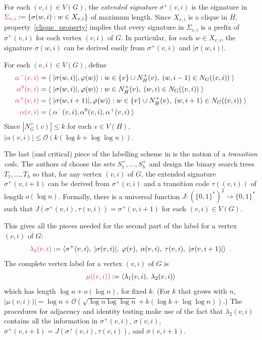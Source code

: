 \documentclass{patmorin}
\makeatletter
\renewcommand{\le}{\leqslant}
\newcommand{\defin}[1]{\emph{\textcolor{brightmaroon}{#1}}}
\def\mathcolor#1#{\@mathcolor{#1}}
\def\@mathcolor#1#2#3{%
  \protect\leavevmode
  \begingroup
    \color#1{#2}#3%
  \endgroup
}
\newcommand{\mathdefin}[1]{\mathcolor{brightmaroon}{#1}}
\newcommand{\Oh}{\mathcal{O}}
\makeatother
\begin{document}
  For each $(v,i)\in V(G)$, the \defin{extended signature} \defin{$\sigma^+(v,i)$} is the signature in $\mathdefin{\Sigma_{v,i}}:=\{\sigma(w,i):w\in X_{v,i}\}$ of maximum length.  Since $X_{v,i}$ is a clique in $H$, property~\ref{clique_property} implies that every signature in $\Sigma_{v,i}$ is a prefix of $\sigma^+(v,i)$ for each vertex $(v,i)$ of $G$.  In particular, for each $w\in X_{v,i}$, the signature $\sigma(w,i)$ can be derived easily from $\sigma^+(v,i)$ and $|\sigma(w,i)|$.


  For each $(v,i)\in V(G)$, define
  \begin{align*}
    \mathdefin{\alpha^{-}(v,i)} &= \langle\; |\sigma(w,i)|, \varphi(w)\rangle : w\in \{v\}\cup N^+_H(v),\; (w,i-1)\in N_G((v,i)) \;\rangle \\
    \mathdefin{\alpha^{0}(v,i)} &= \langle\; |\sigma(w,i)|, \varphi(w)\rangle : w\in N^+_H(v),\; (w,i)\in N_G((v,i)) \;\rangle \\
    \mathdefin{\alpha^+(v,i)} &= \langle\; |\sigma(w,i+1)|, \varphi(w)\rangle : w\in \{v\}\cup N^+_H(v),\; (w,i+1)\in N_G((v,i)) \;\rangle \\
    \mathdefin{\alpha(v,i)} &= \langle\; \alpha^-(v,i),\alpha^0(v,i),\alpha^+(v,i) \;\rangle \\
  \end{align*}
  Since $|N^+_G(v)|\le k$ for each $v\in V(H)$, $|\alpha(v,i)|\le\Oh(k(\log k + \log\log n))$.

  The last (and critical) piece of the labelling scheme in \cite{dujmovic.esperet.ea:adjacency} is the notion of a \defin{transition code}. The authors of \cite{dujmovic.esperet.ea:adjacency} choose the sets $S^+_1,\ldots,S^+_h$ and design the binary search trees $T_1,\ldots,T_h$ so that, for any vertex $(v,i)$ of $G$, the extended signature $\sigma^+(v,i+1)$ can be derived from $\sigma^+(v,i)$ and a transition code \defin{$\tau((v,i))$} of length $o(\log n)$. Formally, there is a universal function $J:(\{0,1\}^*)^2\to\{0,1\}^*$ such that $J(\sigma^+(v,i),\tau(v,i))=\sigma^+(v,i+1)$ for each $(v,i)\in V(G)$.

  This gives all the pieces needed for the second part of the label for a vertex $(v,i)$ of $G$:
  \[
    \mathdefin{\lambda_2(v,i)} := \langle \sigma^+(v,i),\; |\sigma(v,i)|,\; \varphi(v),\; \alpha(v,i),\; \tau(v,i),\; |\sigma(v,i+1)| \rangle  \enspace .
  \]
  The complete vertex label for a vertex $(v,i)$ of $G$ is
  \[
    \mathdefin{\mu((v,i))} := \langle \lambda_1(v,i),\; \lambda_2(v,i) \rangle
  \]
  which has length $\log n + o(\log n)$, for fixed $k$.  (For $k$ that grows with $n$, $|\mu(v,i))|=\log n + \Oh(\sqrt{\log n\log\log n} + k(\log k + \log\log n))$.)
  The procedures for adjacency and identity testing make use of the fact that $\lambda_2(v,i)$ contains all the information in $\sigma^+(v,i)$, $\sigma(v,i)$, $\sigma^+(v,i+1)=J(\sigma^+(v,i),\tau(v,i))$, and $\sigma(v,i+1)$.
\end{document}
